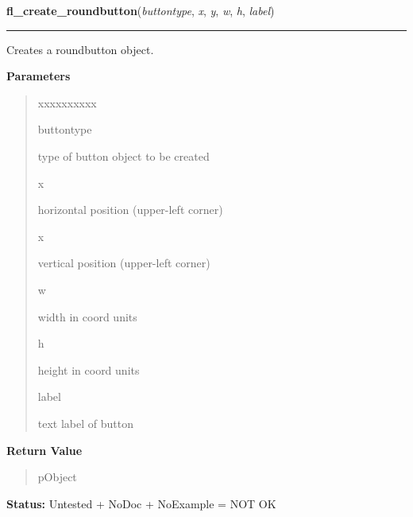     \label{xformslib:library:fl_create_roundbutton}

    \vspace{0.5ex}

\hspace{.8\funcindent}\begin{boxedminipage}{\funcwidth}

    \raggedright \textbf{fl\_create\_roundbutton}(\textit{buttontype}, \textit{x}, \textit{y}, \textit{w}, \textit{h}, \textit{label})

    \vspace{-1.5ex}

    \rule{\textwidth}{0.5\fboxrule}
\setlength{\parskip}{2ex}
    Creates a roundbutton object.

\setlength{\parskip}{1ex}
      \textbf{Parameters}
      \vspace{-1ex}

      \begin{quote}
        \begin{Ventry}{xxxxxxxxxx}

          \item[buttontype]

          type of button object to be created

          \item[x]

          horizontal position (upper-left corner)

          \item[x]

          vertical position (upper-left corner)

          \item[w]

          width in coord units

          \item[h]

          height in coord units

          \item[label]

          text label of button

        \end{Ventry}

      \end{quote}

      \textbf{Return Value}
    \vspace{-1ex}

      \begin{quote}
      pObject

      \end{quote}

\textbf{Status:} Untested + NoDoc + NoExample = NOT OK



    \end{boxedminipage}

